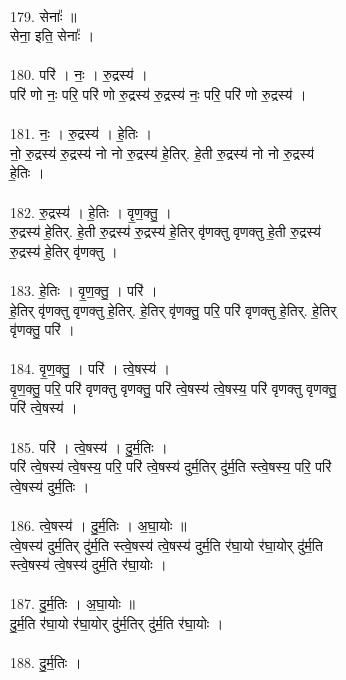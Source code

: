 \\
179. सेनाः᳚ ॥\\
सेना॒ इति॒ सेनाः᳚ ।\\
\\
180. परि॑ । नः॒ । रु॒द्रस्य॑ ।\\
परि॑ णो नः॒ परि॒ परि॑ णो रु॒द्रस्य॑ रु॒द्रस्य॑ नः॒ परि॒ परि॑ णो रु॒द्रस्य॑ ।\\
\\
181. नः॒ । रु॒द्रस्य॑ । हे॒तिः ।\\
नो॒ रु॒द्रस्य॑ रु॒द्रस्य॑ नो नो रु॒द्रस्य॑ हे॒तिर्. हे॒ती रु॒द्रस्य॑ नो नो रु॒द्रस्य॑\\
हे॒तिः ।\\
\\
182. रु॒द्रस्य॑ । हे॒तिः । वृ॒ण॒क्तु॒ ।\\
रु॒द्रस्य॑ हे॒तिर्. हे॒ती रु॒द्रस्य॑ रु॒द्रस्य॑ हे॒तिर् वृ॑णक्तु वृणक्तु हे॒ती रु॒द्रस्य॑\\
रु॒द्रस्य॑ हे॒तिर् वृ॑णक्तु ।\\
\\
183. हे॒तिः । वृ॒ण॒क्तु॒ । परि॑ ।\\
हे॒तिर् वृ॑णक्तु वृणक्तु हे॒तिर्. हे॒तिर् वृ॑णक्तु॒ परि॒ परि॑ वृणक्तु हे॒तिर्. हे॒तिर्\\
वृ॑णक्तु॒ परि॑ ।\\
\\
184. वृ॒ण॒क्तु॒ । परि॑ । त्वे॒षस्य॑ ।\\
वृ॒ण॒क्तु॒ परि॒ परि॑ वृणक्तु वृणक्तु॒ परि॑ त्वे॒षस्य॑ त्वे॒षस्य॒ परि॑ वृणक्तु वृणक्तु॒\\
परि॑ त्वे॒षस्य॑ ।\\
\\
185. परि॑ । त्वे॒षस्य॑ । दु॒र्म॒तिः ।\\
परि॑ त्वे॒षस्य॑ त्वे॒षस्य॒ परि॒ परि॑ त्वे॒षस्य॑ दुर्म॒तिर् दु॑र्म॒ति स्त्वे॒षस्य॒ परि॒ परि॑\\
त्वे॒षस्य॑ दुर्म॒तिः ।\\
\\
186. त्वे॒षस्य॑ । दु॒र्म॒तिः । अ॒घा॒योः ॥\\
त्वे॒षस्य॑ दुर्म॒तिर् दु॑र्म॒ति स्त्वे॒षस्य॑ त्वे॒षस्य॑ दुर्म॒ति र॑घा॒यो र॑घा॒योर् दु॑र्म॒ति\\
स्त्वे॒षस्य॑ त्वे॒षस्य॑ दुर्म॒ति र॑घा॒योः ।\\
\\
187. दु॒र्म॒तिः । अ॒घा॒योः ॥\\
दु॒र्म॒ति र॑घा॒यो र॑घा॒योर् दु॑र्म॒तिर् दु॑र्म॒ति र॑घा॒योः ।\\
\\
188. दु॒र्म॒तिः ।\\
